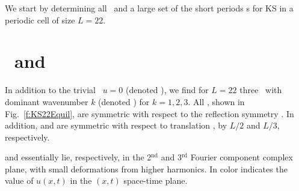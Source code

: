We start by determining
all \eqva\ and a large set of the short periods \rpo s for
KS in a periodic cell of size $L=22$.

\section{\Eqva\ and \reqva}

In addition to the trivial \eqv\ $u=0$ (denoted ),
we find for $L = 22$ three \eqva\ with dominant wavenumber $k$
(denoted ) for $k = 1, 2, 3$.  All {\eqva}, shown in
Fig.~\ref{f:KS22Equil}, are symmetric with respect to the reflection
symmetry .
In addition,  and  are symmetric with respect
to translation , by $L/2$ and $L/3$, respectively.

 and  essentially lie, respectively, in
the 2$^\mathrm{nd}$ and 3$^\mathrm{rd}$ Fourier component complex plane,
with small deformations from higher harmonics.
In 
color indicates the value of $u(x,t)$ in
the $(x,t)$ space-time plane.

